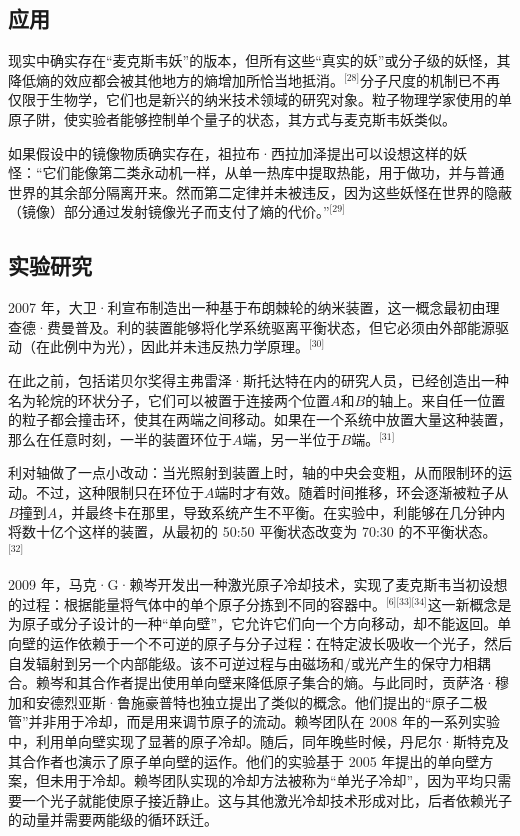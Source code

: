 \subsection{应用}
现实中确实存在“麦克斯韦妖”的版本，但所有这些“真实的妖”或分子级的妖怪，其降低熵的效应都会被其他地方的熵增加所恰当地抵消。\(^\text{[28]}\)分子尺度的机制已不再仅限于生物学，它们也是新兴的纳米技术领域的研究对象。粒子物理学家使用的单原子阱，使实验者能够控制单个量子的状态，其方式与麦克斯韦妖类似。

如果假设中的镜像物质确实存在，祖拉布·西拉加泽提出可以设想这样的妖怪：“它们能像第二类永动机一样，从单一热库中提取热能，用于做功，并与普通世界的其余部分隔离开来。然而第二定律并未被违反，因为这些妖怪在世界的隐蔽（镜像）部分通过发射镜像光子而支付了熵的代价。”\(^\text{[29]}\)
\subsection{实验研究}
2007 年，大卫·利宣布制造出一种基于布朗棘轮的纳米装置，这一概念最初由理查德·费曼普及。利的装置能够将化学系统驱离平衡状态，但它必须由外部能源驱动（在此例中为光），因此并未违反热力学原理。\(^\text{[30]}\)

在此之前，包括诺贝尔奖得主弗雷泽·斯托达特在内的研究人员，已经创造出一种名为轮烷的环状分子，它们可以被置于连接两个位置$A$和$B$的轴上。来自任一位置的粒子都会撞击环，使其在两端之间移动。如果在一个系统中放置大量这种装置，那么在任意时刻，一半的装置环位于$A$端，另一半位于$B$端。\(^\text{[31]}\)

利对轴做了一点小改动：当光照射到装置上时，轴的中央会变粗，从而限制环的运动。不过，这种限制只在环位于$A$端时才有效。随着时间推移，环会逐渐被粒子从 $B$撞到$A$，并最终卡在那里，导致系统产生不平衡。在实验中，利能够在几分钟内将数十亿个这样的装置，从最初的 50:50 平衡状态改变为 70:30 的不平衡状态。\(^\text{[32]}\)

2009 年，马克·G·赖岑开发出一种激光原子冷却技术，实现了麦克斯韦当初设想的过程：根据能量将气体中的单个原子分拣到不同的容器中。\(^\text{[6][33][34]}\)这一新概念是为原子或分子设计的一种“单向壁”，它允许它们向一个方向移动，却不能返回。单向壁的运作依赖于一个不可逆的原子与分子过程：在特定波长吸收一个光子，然后自发辐射到另一个内部能级。该不可逆过程与由磁场和/或光产生的保守力相耦合。赖岑和其合作者提出使用单向壁来降低原子集合的熵。与此同时，贡萨洛·穆加和安德烈亚斯·鲁施豪普特也独立提出了类似的概念。他们提出的“原子二极管”并非用于冷却，而是用来调节原子的流动。赖岑团队在 2008 年的一系列实验中，利用单向壁实现了显著的原子冷却。随后，同年晚些时候，丹尼尔·斯特克及其合作者也演示了原子单向壁的运作。他们的实验基于 2005 年提出的单向壁方案，但未用于冷却。赖岑团队实现的冷却方法被称为“单光子冷却”，因为平均只需要一个光子就能使原子接近静止。这与其他激光冷却技术形成对比，后者依赖光子的动量并需要两能级的循环跃迁。

